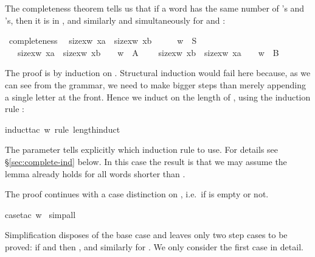 \begin{isabellebody}
\begin{isamarkuptext}
The completeness theorem tells us that if a word has the same number of
's and 's, then it is in , and similarly and
simultaneously for  and :%
\end{isamarkuptext}%
\ completeness{\isacharcolon}\isanewline
\ \ {\isachardoublequote}{\isacharparenleft}size{\isacharbrackleft}x{\isasymin}w{\isachardot}\ x{\isacharequal}a{\isacharbrackright}\ {\isacharequal}\ size{\isacharbrackleft}x{\isasymin}w{\isachardot}\ x{\isacharequal}b{\isacharbrackright}\ \ \ \ \ {\isasymlongrightarrow}\ w\ {\isasymin}\ S{\isacharparenright}\ {\isasymand}\isanewline
\ \ \ {\isacharparenleft}size{\isacharbrackleft}x{\isasymin}w{\isachardot}\ x{\isacharequal}a{\isacharbrackright}\ {\isacharequal}\ size{\isacharbrackleft}x{\isasymin}w{\isachardot}\ x{\isacharequal}b{\isacharbrackright}\ {\isacharplus}\ {}\ {\isasymlongrightarrow}\ w\ {\isasymin}\ A{\isacharparenright}\ {\isasymand}\isanewline
\ \ \ {\isacharparenleft}size{\isacharbrackleft}x{\isasymin}w{\isachardot}\ x{\isacharequal}b{\isacharbrackright}\ {\isacharequal}\ size{\isacharbrackleft}x{\isasymin}w{\isachardot}\ x{\isacharequal}a{\isacharbrackright}\ {\isacharplus}\ {}\ {\isasymlongrightarrow}\ w\ {\isasymin}\ B{\isacharparenright}{\isachardoublequote}%
\begin{isamarkuptxt}%
\noindent
The proof is by induction on . Structural induction would fail here
because, as we can see from the grammar, we need to make bigger steps than
merely appending a single letter at the front. Hence we induct on the length
of , using the induction rule :%
\end{isamarkuptxt}%
induct{\isacharunderscore}tac\ w\ rule{\isacharcolon}\ length{\isacharunderscore}induct{\isacharparenright}%
\begin{isamarkuptxt}%
\noindent
The  parameter tells  explicitly which induction
rule to use. For details see \S\ref{sec:complete-ind} below.
In this case the result is that we may assume the lemma already
holds for all words shorter than .

The proof continues with a case distinction on ,
i.e.\ if  is empty or not.%
\end{isamarkuptxt}%
case{\isacharunderscore}tac\ w{\isacharparenright}\isanewline
\ simp{\isacharunderscore}all{\isacharparenright}%
\begin{isamarkuptxt}%
\noindent
Simplification disposes of the base case and leaves only two step
cases to be proved:
if  and  then
, and similarly for .
We only consider the first case in detail.


\end{isamarkuptxt}
\end{isabellebody}
